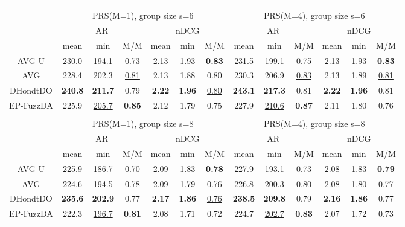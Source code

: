 \begin{tabular}{ c | c c c | c c c || c c c | c c c }
\multicolumn{12}{c}{} \\
\multicolumn{1}{c}{} & \multicolumn{6}{c}{PRS(M=1), group size s=6} & \multicolumn{6}{c}{PRS(M=4), group size s=6} \\
\multicolumn{1}{c}{} & \multicolumn{3}{c}{AR} & \multicolumn{3}{c}{nDCG} & \multicolumn{3}{c}{AR} & \multicolumn{3}{c}{nDCG} \\
& mean & min & M/M & mean & min & M/M & mean & min & M/M & mean & min & M/M \\
\hline
AVG-U & \underline{230.0} & 194.1 & 0.73 & \underline{2.13} & \underline{1.93} & \textbf{0.83} & \underline{231.5} & 199.1 & 0.75 & \underline{2.13} & \underline{1.93} & \textbf{0.83} \\
AVG & 228.4 & 202.3 & \underline{0.81} & 2.13 & 1.88 & 0.80 & 230.3 & 206.9 & \underline{0.83} & 2.13 & 1.89 & \underline{0.81} \\
DHondtDO & \textbf{240.8} & \textbf{211.7} & 0.79 & \textbf{2.22} & \textbf{1.96} & \underline{0.80} & \textbf{243.1} & \textbf{217.3} & 0.81 & \textbf{2.22} & \textbf{1.96} & 0.81 \\
EP-FuzzDA & 225.9 & \underline{205.7} & \textbf{0.85} & 2.12 & 1.79 & 0.75 & 227.9 & \underline{210.6} & \textbf{0.87} & 2.11 & 1.80 & 0.76 \\

\multicolumn{12}{c}{} \\
\multicolumn{1}{c}{} & \multicolumn{6}{c}{PRS(M=1), group size s=8} & \multicolumn{6}{c}{PRS(M=4), group size s=8} \\
\multicolumn{1}{c}{} & \multicolumn{3}{c}{AR} & \multicolumn{3}{c}{nDCG} & \multicolumn{3}{c}{AR} & \multicolumn{3}{c}{nDCG} \\
& mean & min & M/M & mean & min & M/M & mean & min & M/M & mean & min & M/M \\
\hline
AVG-U & \underline{225.9} & 186.7 & 0.70 & \underline{2.09} & \underline{1.83} & \textbf{0.78} & \underline{227.9} & 193.1 & 0.73 & \underline{2.08} & \underline{1.83} & \textbf{0.79} \\
AVG & 224.6 & 194.5 & \underline{0.78} & 2.09 & 1.79 & 0.76 & 226.8 & 200.3 & \underline{0.80} & 2.08 & 1.80 & \underline{0.77} \\
DHondtDO & \textbf{235.6} & \textbf{202.9} & 0.77 & \textbf{2.17} & \textbf{1.86} & \underline{0.76} & \textbf{238.5} & \textbf{209.8} & 0.79 & \textbf{2.16} & \textbf{1.86} & 0.77 \\
EP-FuzzDA & 222.3 & \underline{196.7} & \textbf{0.81} & 2.08 & 1.71 & 0.72 & 224.7 & \underline{202.7} & \textbf{0.83} & 2.07 & 1.72 & 0.73 \\

\end{tabular}
